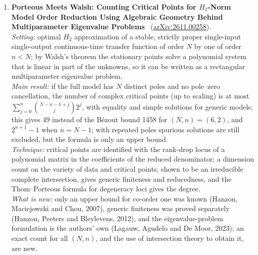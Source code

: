 \documentclass[11pt,a4paper]{article}
\begin{document}
\begin{enumerate}[leftmargin=*]
  \emph{Limitations:} a long single-author paper whose proofs are in appendices that were cut off in the text read; constants are not explicit; the policy needs $\rho$ and the horizon as inputs; compact affine families only; no simulations, and the examples are scalar or two-dimensional.\\
  \emph{Verdict:} a tight characterisation of achievable regret in adaptive \ac{LQG} control, with a hierarchy of regimes read off from algebraic data; confidence medium (full text; appendices not reached).
  \item \textbf{Porteous Meets Walsh: Counting Critical Points for $H_2$-Norm Model Order Reduction Using Algebraic Geometry Behind Multiparameter Eigenvalue Problems}~\cite{lagauw2026porteous} (\href{https://arxiv.org/abs/2611.00258}{arXiv:2611.00258}).\\
  \emph{Setting:} optimal $H_2$ approximation of a stable, strictly proper single-input single-output continuous-time transfer function of order $N$ by one of order $n < N$; by Walsh's theorem the stationary points solve a polynomial system that is linear in part of the unknowns, so it can be written as a rectangular multiparameter eigenvalue problem.\\
  \emph{Main result:} if the full model has $N$ distinct poles and no pole--zero cancellation, the number of complex critical points (up to scaling) is at most $\sum_{j=0}^{n} \binom{N-n-1+j}{j} 2^j$, with equality and simple solutions for generic models; this gives 49 instead of the B{\'e}zout bound 1458 for $(N,n) = (6,2)$, and $2^{n+1}-1$ when $n = N-1$; with repeated poles spurious solutions are still excluded, but the formula is only an upper bound.\\
  \emph{Technique:} critical points are identified with the rank-drop locus of a polynomial matrix in the coefficients of the reduced denominator; a dimension count on the variety of data and critical points, shown to be an irreducible complete intersection, gives generic finiteness and reducedness, and the Thom--Porteous formula for degeneracy loci gives the degree.\\
  \emph{What is new:} only an upper bound for co-order one was known (Hanzon, Maciejowski and Chou, 2007), generic finiteness was proved separately (Hanzon, Peeters and Bleylevens, 2012), and the eigenvalue-problem formulation is the authors' own (Lagauw, Agudelo and De Moor, 2023); an exact count for all $(N,n)$, and the use of intersection theory to obtain it, are new.\\

\end{enumerate}
\end{document}
